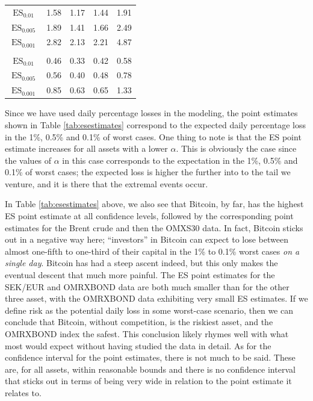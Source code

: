 \documentclass[a4paper,11pt]{article}
\theoremstyle{definition}
\theoremstyle{definition}
\theoremstyle{definition}
\theoremstyle{definition}
\theoremstyle{remark}
\begin{document}
\begin{table}[H]
\begin{tabular}[t]{ccccc}
\hspace{1em}$\operatorname{ES}_{0.01}$ & 1.58 & 1.17 & 1.44 & 1.91\\
\hspace{1em}$\operatorname{ES}_{0.005}$ & 1.89 & 1.41 & 1.66 & 2.49\\
\hspace{1em}$\operatorname{ES}_{0.001}$ & 2.82 & 2.13 & 2.21 & 4.87\\
\addlinespace[0.3em]
\multicolumn{5}{l}{\textbf{OMRXBOND}}\\
\hspace{1em}$\operatorname{ES}_{0.01}$ & 0.46 & 0.33 & 0.42 & 0.58\\
\hspace{1em}$\operatorname{ES}_{0.005}$ & 0.56 & 0.40 & 0.48 & 0.78\\
\hspace{1em}$\operatorname{ES}_{0.001}$ & 0.85 & 0.63 & 0.65 & 1.33\\
\bottomrule
\end{tabular}
\end{table}
Since we have used daily percentage losses in the modeling, the point estimates shown in Table \ref{tab:esestimates} correspond to the expected daily percentage loss in the 1\%, 0.5\% and 0.1\% of worst cases. One thing to note is that the ES point estimate increases for all assets with a lower \(\alpha\). This is obviously the case since the values of \(\alpha\) in this case corresponds to the expectation in the 1\%, 0.5\% and 0.1\% of worst cases; the expected loss is higher the further into to the tail we venture, and it is there that the extremal events occur.

In Table \ref{tab:esestimates} above, we also see that Bitcoin, by far, has the highest ES point estimate at all confidence levels, followed by the corresponding point estimates for the Brent crude and then the OMXS30 data. In fact, Bitcoin sticks out in a negative way here; ``investors'' in Bitcoin can expect to lose between almost one-fifth to one-third of their capital in the 1\% to 0.1\% worst cases \emph{on a single day}. Bitcoin has had a steep ascent indeed, but this only makes the eventual descent that much more painful. The ES point estimates for the SEK/EUR and OMRXBOND data are both much smaller than for the other three asset, with the OMRXBOND data exhibiting very small ES estimates. If we define risk as the potential daily loss in some worst-case scenario, then we can conclude that Bitcoin, without competition, is the riskiest asset, and the OMRXBOND index the safest. This conclusion likely rhymes well with what most would expect without having studied the data in detail. As for the confidence interval for the point estimates, there is not much to be said. These are, for all assets, within reasonable bounds and there is no confidence interval that sticks out in terms of being very wide in relation to the point estimate it relates to.
\end{document}
